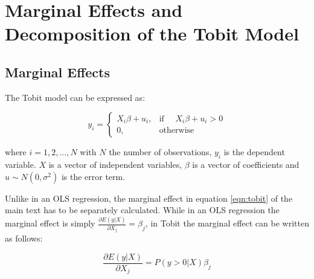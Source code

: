 \documentclass[preprint,12pt,authoryear]{elsarticle}
\begin{document}




% 
%



\newpage
\appendix
	
	\section{ Marginal Effects  and Decomposition of the Tobit Model}
	\label{app:TobitDecomp}
	
	\subsection{ Marginal Effects}
	The Tobit model can be expressed as:
	
	\begin{equation*}
	y_i= 
	\begin{cases}
	X_i \beta  + u_i ,& \text{if } \quad X_i \beta  + u_i >0\\
	0,              & \text{otherwise}
	\end{cases}
	\end{equation*}
	
	where $i=1,2,...,N$ with $N$ the number of observations, $y_i$ is the dependent variable. $X$ is a vector of independent variables, $\beta$ is a vector of coefficients and $u \sim N(0,\sigma^2)$ is the error term. 
	
	Unlike in an OLS regression, the marginal effect in equation \ref{eqn:tobit} of the main text has to be separately calculated. While in an OLS regression the marginal effect is simply $\frac{\partial E(y|X)}{\partial X_{j}}=\beta_j$, in Tobit the marginal effect can be written as follows:
	
	\begin{equation}
	\label{eqn:tobit_marginal}
	\frac{\partial E(y| X)}{\partial X_j} = P(y>0|X) \beta_j
	\end{equation}
	
\end{document}
